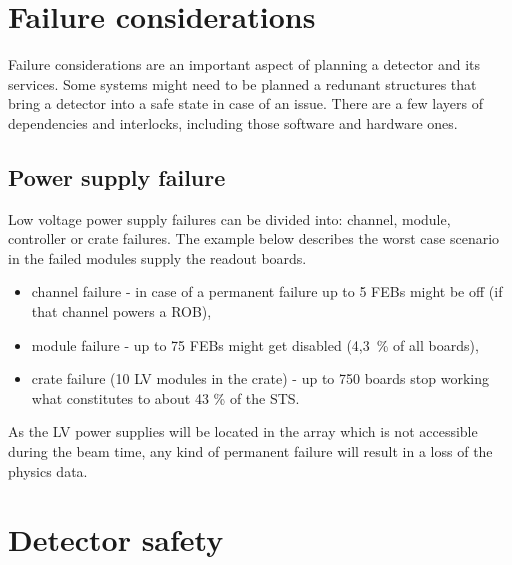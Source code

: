 \section{Failure considerations}

Failure considerations are an important aspect of planning a detector and its services. Some systems might need to be planned a redunant structures that bring a detector into a safe state in case of an issue. There are a few layers of dependencies and interlocks, including those software and hardware ones.

\subsection{Power supply failure}
Low voltage power supply failures can be divided into: channel, module, controller or crate failures. The example below describes the worst case scenario in the failed modules supply the readout boards.

\begin{itemize}
    \item channel failure - in case of a permanent failure up to 5 \gls{FEB}s might be off (if that channel powers a \gls{ROB}),
    \item module failure - up to 75 \gls{FEB}s might get disabled (4,3~\% of all boards), 
    \item crate failure (10 LV modules in the crate) - up to 750 boards stop working what constitutes to about 43 \% of the STS.
\end{itemize}

As the LV power supplies will be located in the array which is not accessible during the beam time, any kind of permanent failure will result in a loss of the physics data. 

\section{Detector safety}
